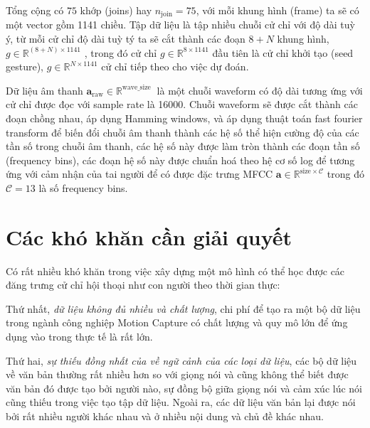 Tổng cộng có $75$ khớp (joins) hay $n_{\text{join}} = 75$, với mỗi khung hình (frame) ta sẽ có một vector gồm 1141 chiều.
Tập dữ liệu là tập nhiều chuỗi cử chỉ với độ dài tuỳ ý, từ mỗi cử chỉ độ dài tuỳ tý ta sẽ cắt thành các đoạn $8 + N$ khung hình, $g \in \mathbb{R}^{(8+N) \times 1141}$ , trong đó cử chỉ $g \in \mathbb{R}^{8 \times 1141}$ đầu tiên là cử chỉ khởi tạo (seed gesture), $g \in \mathbb{R}^{N \times 1141}$ cử chỉ tiếp theo cho việc dự đoán.

Dữ liệu âm thanh $\mathbf{a}_{\text{raw}} \in \mathbb{R}^{ \text{wave\_size } }$  là một chuỗi waveform có độ dài tương ứng với cử chỉ được đọc với sample rate là 16000. Chuỗi waveform sẽ được cắt thành các đoạn chồng nhau, áp dụng Hamming windows, và áp dụng thuật toán fast fourier transform để biến đổi chuỗi âm thanh thành các hệ số thể hiện cường độ của các tần số trong chuỗi âm thanh, các hệ số này được làm tròn thành các đoạn tần số (frequency bins), các đoạn hệ số này được chuẩn hoá theo hệ cơ số log để tương ứng với cảm nhận của tai người để có được đặc trưng MFCC $\mathbf{a} \in \mathbb{R}^{\text{size} \times \mathcal{C}}$ trong đó $\mathcal{C}=13$ là số frequency bins. 



\section{Các khó khăn cần giải quyết}

Có rất nhiều khó khăn trong việc xây dựng một mô hình có thể học được các đăng trưng cử chỉ hội thoại như con người theo thời gian thực:

Thứ nhất, \textit{dữ liệu không đủ nhiều và chất lượng}, chi phí để tạo ra một bộ dữ liệu trong ngành công nghiệp Motion Capture có chất lượng và quy mô lớn để ứng dụng vào trong thực tế là rất lớn.

Thứ hai, \textit{sự thiếu đồng nhất của về ngữ cảnh của các loại dữ liệu}, các bộ dữ liệu về văn bản thường rất nhiều hơn so với giọng nói và cũng không thể biết được văn bản đó được tạo bởi người nào, sự đồng bộ giữa giọng nói và cảm xúc lúc nói cũng thiếu trong việc tạo tập dữ liệu. Ngoài ra, các dữ liệu văn bản lại được nói bởi rất nhiều người khác nhau và ở nhiều nội dung và chủ đề khác nhau.
 
